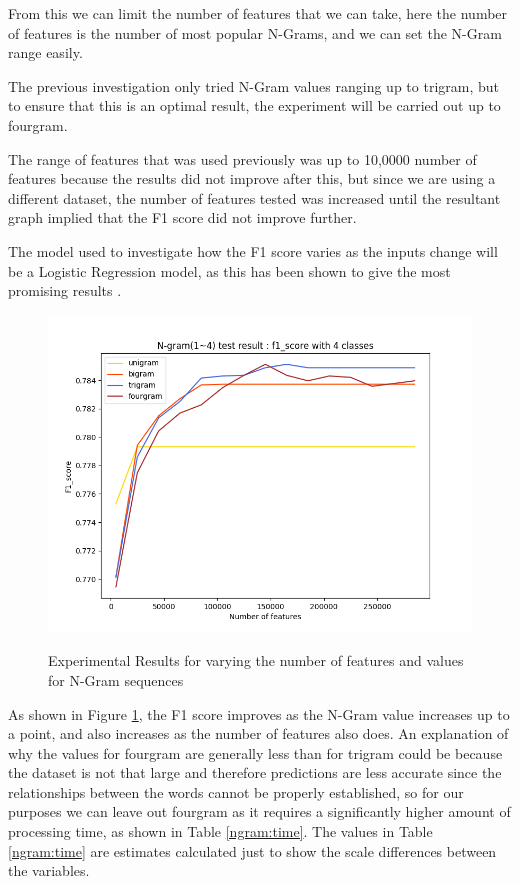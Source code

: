 From this we can limit the number of features that we can take, here the number of features is the number of most popular N-Grams, and we can set the N-Gram range easily. 

The previous investigation only tried N-Gram values ranging up to trigram, but to ensure that this is an optimal result, the experiment will be carried out up to fourgram.

The range of features that was used previously was up to 10,0000 number of features because the results did not improve after this, but since we are using a different dataset, the number of features tested was increased until the resultant graph implied that the F1 score did not improve further. 

The model used to investigate how the F1 score varies as the inputs change will be a Logistic Regression model, as this has been shown to give the most promising results \cite{towardsDS}.

\begin{figure}[h]
\caption{Experimental Results for varying the number of features and values for N-Gram sequences}
\centering
\includegraphics[scale=0.7]{graphs/nGramBinaryGraph300000.png}
\label{ngramGraph}
\end{figure}

As shown in Figure \ref{ngramGraph}, the F1 score improves as the N-Gram value increases up to a point, and also increases as the number of features also does. An explanation of why the values for fourgram are generally less than for trigram could be because the dataset is not that large and therefore predictions are less accurate since the relationships between the words cannot be properly established, so for our purposes we can leave out fourgram as it requires a significantly higher amount of processing time, as shown in Table \ref{ngram:time}. The values in Table \ref{ngram:time} are estimates calculated just to show the scale differences between the variables.


